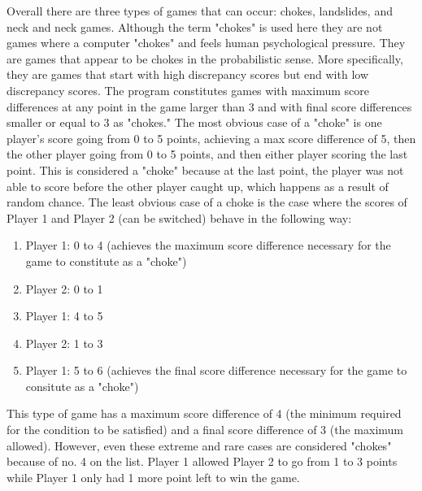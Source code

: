 \documentclass{article}
\begin{document}
Overall there are three types of games that can occur: chokes, landslides, and neck and neck games.
Although the term "chokes" is used here they are not games where a computer "chokes" and feels human psychological pressure. They are games that appear to be chokes in the probabilistic sense. More specifically, they are games that start with high discrepancy scores but end with low discrepancy scores. The program constitutes games with maximum score differences at any point in the game larger than 3 and with final score differences smaller or equal to 3 as "chokes." The most obvious case of a "choke" is one player's score going from 0 to 5 points, achieving a max score difference of 5, then the other player going from 0 to 5 points, and then either player scoring the last point. This is considered a "choke" because at the last point, the player was not able to score before the other player caught up, which happens as a result of random chance. The least obvious case of a choke is the case where the scores of Player 1 and Player 2 (can be switched) behave in the following way:
\begin{enumerate}
	\item Player 1: 0 to 4 (achieves the maximum score difference necessary for the game to constitute as a "choke")
	\item Player 2: 0 to 1
	\item Player 1: 4 to 5
	\item Player 2: 1 to 3
	\item Player 1: 5 to 6 (achieves the final score difference necessary for the game to consitute as a "choke")
\end{enumerate}
This type of game has a maximum score difference of 4 (the minimum required for the condition to be satisfied) and a final score difference of 3 (the maximum allowed). However, even these extreme and rare cases are considered "chokes" because of no. 4 on the list. Player 1 allowed Player 2 to go from 1 to 3 points while Player 1 only had 1 more point left to win the game.
\end{document}
